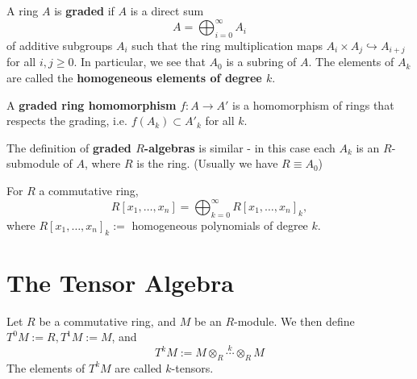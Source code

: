 \begin{defn}
    A ring $A$ is \textbf{graded} if $A$ is a direct sum
    $$A = \bigoplus_{i = 0}^\infty A_i$$
    of additive subgroups $A_i$ such that the ring multiplication maps $A_i \times A_j \hookrightarrow A_{i+j}$ for all $i,j\geq0$. In particular, we see that $A_0$ is a subring of $A$. The elements of $A_k$ are called the \textbf{homogeneous elements of degree $k$}.

    A \textbf{graded ring homomorphism} $f:A \to A'$ is a homomorphism of rings that respects the grading, i.e. $f(A_k) \subset A'_k$ for all $k$.

    The definition of \textbf{graded $R$-algebras} is similar - in this case each $A_k$ is an $R$-submodule of $A$, where $R$ is the ring. (Usually we have $R \equiv A_0$)
\end{defn}

\begin{ex}
    For $R$ a commutative ring,
    $$R[x_1,\dots,x_n] = \bigoplus _{k=0}^\infty R[x_1,\dots,x_n]_k,$$
    where $R[x_1,\dots,x_n]_k :=$ homogeneous polynomials of degree $k$.
\end{ex}

\section{The Tensor Algebra}

\begin{defn}
    Let $R$ be a commutative ring, and $M$ be an $R$-module. We then define $T^0M:=R,T^1M:=M$, and
    $$T^kM := M \otimes _R \overset{k}{\cdots} \otimes _R M $$
    The elements of $T^kM$ are called $k$-tensors.
\end{defn}

